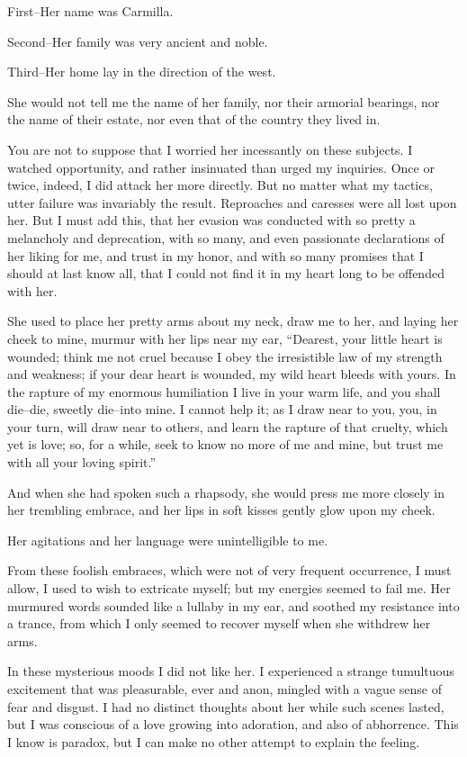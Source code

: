 \documentclass[11pt,twoside,makeidx,hidelinks,]{memoir}
\begin{document}
First--Her name was Carmilla.

Second--Her family was very ancient and noble.

Third--Her home lay in the direction of the west.

She would not tell me the name of her family, nor their armorial
bearings, nor the name of their estate, nor even that of the country
they lived in.

You are not to suppose that I worried her incessantly on these subjects.
I watched opportunity, and rather insinuated than urged my inquiries.
Once or twice, indeed, I did attack her more directly. But no matter
what my tactics, utter failure was invariably the result. Reproaches and
caresses were all lost upon her. But I must add this, that her evasion
was conducted with so pretty a melancholy and deprecation, with so many,
and even passionate declarations of her liking for me, and trust in my
honor, and with so many promises that I should at last know all, that I
could not find it in my heart long to be offended with her.

She used to place her pretty arms about my neck, draw me to her, and
laying her cheek to mine, murmur with her lips near my ear, ``Dearest,
your little heart is wounded; think me not cruel because I obey the
irresistible law of my strength and weakness; if your dear heart is
wounded, my wild heart bleeds with yours. In the rapture of my enormous
humiliation I live in your warm life, and you shall die--die, sweetly
die--into mine. I cannot help it; as I draw near to you, you, in your
turn, will draw near to others, and learn the rapture of that cruelty,
which yet is love; so, for a while, seek to know no more of me and mine,
but trust me with all your loving spirit.''

And when she had spoken such a rhapsody, she would press me more closely
in her trembling embrace, and her lips in soft kisses gently glow
upon my cheek.

Her agitations and her language were unintelligible to me.

From these foolish embraces, which were not of very frequent occurrence,
I must allow, I used to wish to extricate myself; but my energies seemed
to fail me. Her murmured words sounded like a lullaby in my ear, and
soothed my resistance into a trance, from which I only seemed to recover
myself when she withdrew her arms.

In these mysterious moods I did not like her. I experienced a strange
tumultuous excitement that was pleasurable, ever and anon, mingled with
a vague sense of fear and disgust. I had no distinct thoughts about her
while such scenes lasted, but I was conscious of a love growing into
adoration, and also of abhorrence. This I know is paradox, but I can
make no other attempt to explain the feeling.
\end{document}
